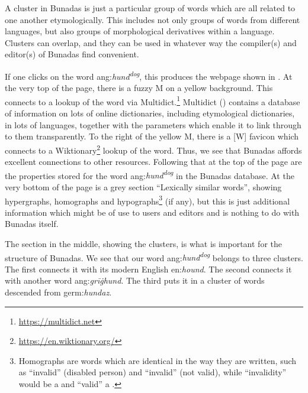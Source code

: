 \documentclass[output=paper,colorlinks,citecolor=brown]{langscibook}
\begin{document}
A cluster in Bunadas is just a particular group of words which are all related to one another etymologically. This includes not only groups of words from different languages, but also groups of morphological derivatives within a language. Clusters can overlap, and they can be used in whatever way the compiler(s) and editor(s) of Bunadas find convenient. 

If one clicks on the word ang:\textit{hund}\textit{\textsuperscript{dog}}, this produces the webpage shown in . At the very top of the page, there is a fuzzy M on a yellow background. This connects to a  lookup of the word via Multidict.\footnote{ \url{https://multidict.net} } Multidict (\cite{cod:ÓDonnaíle2014}) contains a database of information on lots of online dictionaries, including etymological dictionaries, in lots of languages, together with the parameters which enable it to link through to them transparently. To the right of the yellow M, there is a [W] favicon which connects to a Wiktionary\footnote{ \url{https://en.wiktionary.org/} } lookup of the word. Thus, we see that Bunadas affords excellent connections to other resources. Following that at the top of the page are the properties stored for the word ang:\textit{hund}\textit{\textsuperscript{dog}} in the Bunadas database. At the very bottom of the page is a grey section ``Lexically similar words”, showing hypergraphs, homographs and hypographs\footnote{ Homographs are words which are identical in the way they are written, such as ``invalid” (disabled person) and ``invalid” (not valid), while ``invalidity” would be a  and ``valid” a .} (if any), but this is just additional information which might be of use to users and editors and is nothing to do with Bunadas itself.

The section in the middle, showing the clusters, is what is important for the structure of Bunadas. We see that our word ang:\textit{hund}\textit{\textsuperscript{dog}} belongs to three clusters. The first connects it with its modern English  en:\textit{hound}. The second connects it with another  word ang:\textit{grī\.ghund}. The third puts it in a cluster of words descended from  germ:\textit{hundaz}.
\end{document}
